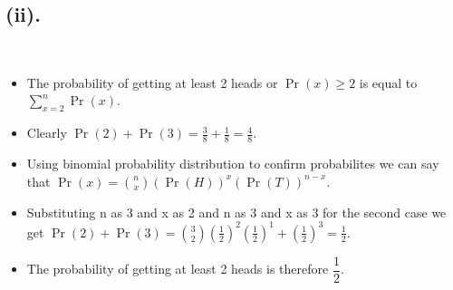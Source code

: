 \documentclass{article}
\begin{document}
	\subsection*{(ii).}\\
	\begin{itemize}
		\item The probability of getting at least 2 heads or $\Pr(x)\geq 2$ is equal to $\sum_{x=2}^{n}\Pr(x)$. \\[4pt]
		\item Clearly $\Pr(2)+\Pr(3)= \frac{3}{8}+\frac{1}{8}= \frac{4}{8}$.\\[4pt]
		\item Using binomial probability distribution to confirm probabilites we can say that $\Pr(x)={n\choose x}(\Pr(H))^x(\Pr(T))^{n-x}$.\\[4pt]
		\item Substituting n as 3 and x as 2 and n as 3 and x as 3 for the second case we get $\Pr(2)+\Pr(3)={3\choose 2}(\frac{1}{2})^2(\frac{1}{2})^1+(\frac{1}{2})^3=\frac{1}{2}$.\\[4pt]
		\item The probability of getting at least 2 heads is therefore $\dfrac{1}{2}$.
	\end{itemize}
\end{document}
